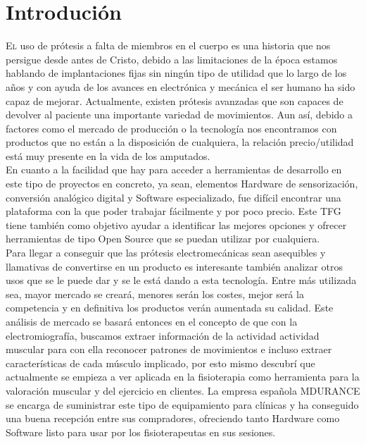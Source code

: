 \chapter{Introdución}
\label{chap:introducion}

\lettrine{E}{l} uso de prótesis a falta de miembros en el cuerpo es una historia que nos persigue desde antes de Cristo, debido a las limitaciones de la época estamos hablando de implantaciones fijas sin ningún tipo de utilidad que lo largo de los años y con ayuda de los avances en electrónica y mecánica el ser humano ha sido capaz de mejorar. Actualmente, existen prótesis avanzadas que son capaces de devolver al paciente una importante variedad de movimientos. Aun así, debido a factores como el mercado de producción o la tecnología nos encontramos con productos que no están a la disposición de cualquiera, la relación precio/utilidad está muy presente en la vida de los amputados.\\

En cuanto a la facilidad que hay para acceder a herramientas de desarrollo en este tipo de proyectos en concreto, ya sean, elementos Hardware de sensorización, conversión analógico digital y Software especializado, fue difícil encontrar una plataforma con la que poder trabajar fácilmente y por poco precio. Este TFG tiene también como objetivo ayudar a identificar las mejores opciones y ofrecer herramientas de tipo Open Source que se puedan utilizar por cualquiera.\\

Para llegar a conseguir que las prótesis electromecánicas sean asequibles y llamativas de convertirse en un producto es interesante también analizar otros usos que se le puede dar y se le está dando a esta tecnología. Entre más utilizada sea, mayor mercado se creará, menores serán los costes, mejor será la competencia y en definitiva los productos verán aumentada su calidad. 
Este análisis de mercado se basará entonces en el concepto de que con la electromiografía, buscamos extraer información de la actividad actividad muscular para con ella reconocer patrones de movimientos e incluso extraer características de cada músculo implicado, por esto mismo descubrí que actualmente se empieza a ver aplicada en la fisioterapia como herramienta para la valoración muscular y del ejercicio en clientes.
La empresa española MDURANCE se encarga de suministrar este tipo de equipamiento para clínicas y ha conseguido una buena recepción entre sus compradores, ofreciendo tanto Hardware como Software listo para usar por los fisioterapeutas en sus sesiones.

